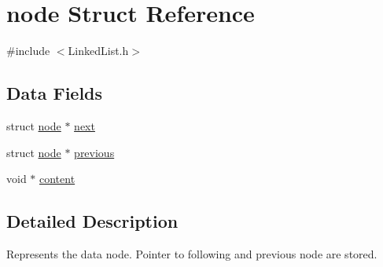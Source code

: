\hypertarget{structnode}{\section{node Struct Reference}
\label{structnode}
}


{\ttfamily \#include $<$Linked\-List.\-h$>$}

\subsection*{Data Fields}
\begin{DoxyCompactItemize}
\item 
struct \hyperlink{structnode}{node} $\ast$ \hyperlink{structnode_a0dc1b6470487aa86d9936e3cab8b95be}{next}
\item 
struct \hyperlink{structnode}{node} $\ast$ \hyperlink{structnode_aba783da56f092df6846bd3b7b9555728}{previous}
\item 
void $\ast$ \hyperlink{structnode_a3d6d14728fec84498eff595a3e31d15a}{content}
\end{DoxyCompactItemize}


\subsection{Detailed Description}
Represents the data node. Pointer to following and previous node are stored. 

